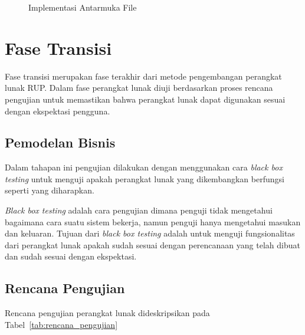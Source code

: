 \begin{figure}[H]
  \centering
  \caption{Implementasi Antarmuka File}
  \label{fig:interface_file}
\end{figure}

\section{Fase Transisi}
Fase transisi merupakan fase terakhir dari metode pengembangan perangkat lunak RUP\@. Dalam fase perangkat
lunak diuji berdasarkan proses rencana pengujian untuk memastikan bahwa perangkat lunak dapat digunakan
sesuai dengan ekspektasi pengguna.

\subsection{Pemodelan Bisnis}
Dalam tahapan ini pengujian dilakukan dengan menggunakan cara \emph{black box testing} untuk menguji
apakah perangkat lunak yang dikembangkan berfungsi seperti yang diharapkan.

\emph{Black box testing} adalah cara pengujian dimana penguji tidak mengetahui bagaimana cara suatu sistem
bekerja, namun penguji hanya mengetahui masukan dan keluaran. Tujuan dari \emph{black box testing}
adalah untuk menguji fungsionalitas dari perangkat lunak apakah sudah sesuai dengan perencanaan yang telah dibuat
dan sudah sesuai dengan ekspektasi.

\subsection{Rencana Pengujian}
Rencana pengujian perangkat lunak dideskripsikan pada Tabel~\ref{tab:rencana_pengujian}

